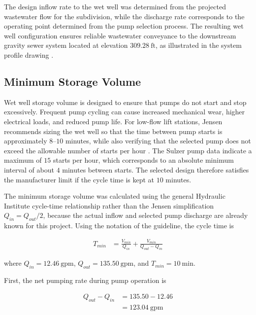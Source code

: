 The design inflow rate to the wet well was determined from the projected wastewater flow for the subdivision, while the discharge rate corresponds to the operating point determined from the pump selection process. The resulting wet well configuration ensures reliable wastewater conveyance to the downstream gravity sewer system located at elevation $309.28~\text{ft}$, as illustrated in the system profile drawing \cite{ProjectD_Colebrooke_2020}.

\subsection{Minimum Storage Volume}

Wet well storage volume is designed to ensure that pumps do not start and stop excessively. Frequent pump cycling can cause increased mechanical wear, higher electrical loads, and reduced pump life. For low-flow lift stations, Jensen recommends sizing the wet well so that the time between pump starts is approximately $8$--$10$ minutes, while also verifying that the selected pump does not exceed the allowable number of starts per hour \cite{Jensen_PumpStationDesignGuidelines_2012}. The Sulzer pump data indicate a maximum of $15$ starts per hour, which corresponds to an absolute minimum interval of about $4$ minutes between starts. The selected design therefore satisfies the manufacturer limit if the cycle time is kept at $10$ minutes.

The minimum storage volume was calculated using the general Hydraulic Institute cycle-time relationship rather than the Jensen simplification $Q_{in}=Q_{out}/2$, because the actual inflow and selected pump discharge are already known for this project. Using the notation of the guideline, the cycle time is

\[
\begin{aligned}
T_{min} &= \frac{V_{min}}{Q_{in}} + \frac{V_{min}}{Q_{out}-Q_{in}}
\end{aligned}
\]

where $Q_{in}=12.46~\text{gpm}$, $Q_{out}=135.50~\text{gpm}$, and $T_{min}=10~\text{min}$.

First, the net pumping rate during pump operation is

\[
\begin{aligned}
Q_{out}-Q_{in} &= 135.50-12.46 \\
&= 123.04~\text{gpm}
\end{aligned}
\]

